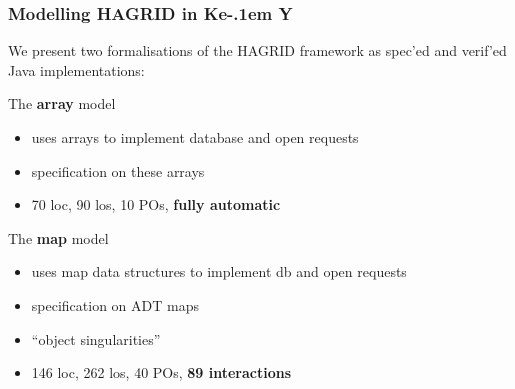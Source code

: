 \documentclass{beamer}
\newcommand{\KeY}{Ke\kern-.1em Y}
\begin{document}
\begin{frame}
  \frametitle{Modelling HAGRID in \KeY}

  We present two formalisations of the HAGRID framework as spec'ed and
  verif'ed Java implementations:
  \pause
  
  \begin{block}{The \textbf{array} model}
    \begin{itemize}
    \item uses arrays to implement database and open requests
    \item specification on these arrays
    \item 70 loc, 90 los, 10 POs, \textbf{fully automatic}
    \end{itemize}
  \end{block}

    
  
  \pause
  \begin{exampleblock}{The \textbf{map} model}
  \begin{itemize}
    \item uses map data structures to implement db and open requests
    \item specification on ADT maps
    \item ``object singularities''
    \item 146 loc, 262 los, 40 POs, \textbf{89 interactions}
    \end{itemize}
  \end{exampleblock}
  
\end{frame}
\end{document}

